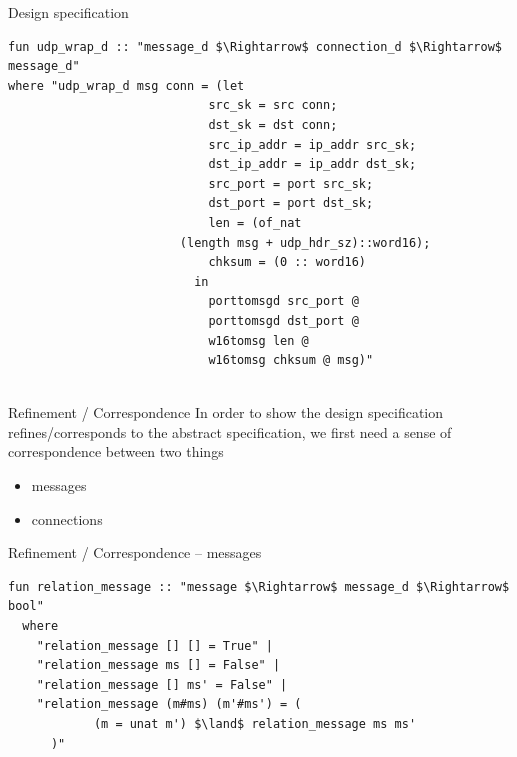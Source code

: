 \documentclass{beamer}
\begin{document}


\begin{frame}[fragile]{Design specification}
    \begin{lstlisting}[language=isabelle]
fun udp_wrap_d :: "message_d $\Rightarrow$ connection_d $\Rightarrow$ message_d"
where "udp_wrap_d msg conn = (let
                            src_sk = src conn;
                            dst_sk = dst conn;
                            src_ip_addr = ip_addr src_sk;
                            dst_ip_addr = ip_addr dst_sk;
                            src_port = port src_sk;
                            dst_port = port dst_sk;
                            len = (of_nat
                        (length msg + udp_hdr_sz)::word16);
                            chksum = (0 :: word16)
                          in
                            porttomsgd src_port @
                            porttomsgd dst_port @
                            w16tomsg len @
                            w16tomsg chksum @ msg)"


    \end{lstlisting}
\end{frame}

\begin{frame}{Refinement / Correspondence}
In order to show the design specification refines/corresponds to the abstract specification,
we first need a sense of correspondence between two things
\begin{itemize}
    \item messages
    \item connections
\end{itemize}
\end{frame}

\begin{frame}[fragile]{Refinement / Correspondence -- messages}
    
    \begin{lstlisting}[language=isabelle]
fun relation_message :: "message $\Rightarrow$ message_d $\Rightarrow$ bool"
  where
    "relation_message [] [] = True" |
    "relation_message ms [] = False" |
    "relation_message [] ms' = False" |
    "relation_message (m#ms) (m'#ms') = (
            (m = unat m') $\land$ relation_message ms ms'
      )"


    \end{lstlisting}
\end{frame}
\end{document}
